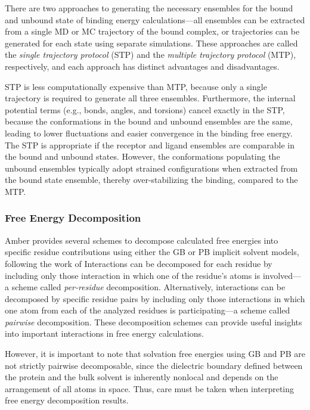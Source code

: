 There are two approaches to generating the necessary ensembles for the bound and
unbound state of binding energy calculations---all ensembles can be extracted
from a single MD or MC trajectory of the bound complex, or trajectories can be
generated for each state using separate simulations. \cite{Wang2006} These
approaches are called the \emph{single trajectory protocol} (STP) and the
\emph{multiple trajectory protocol} (MTP), respectively, and each approach has
distinct advantages and disadvantages.

STP is less computationally expensive than MTP, because only a single trajectory
is required to generate all three ensembles. Furthermore, the internal potential
terms (e.g., bonds, angles, and torsions) cancel exactly in the STP, because
the conformations in the bound and unbound ensembles are the same, leading to
lower fluctuations and easier convergence in the binding free energy. The STP is
appropriate if the receptor and ligand ensembles are comparable in the bound and
unbound states. However, the conformations populating the unbound ensembles
typically adopt strained configurations when extracted from the bound state
ensemble, thereby over-stabilizing the binding, compared to the MTP.

\subsubsection{Free Energy Decomposition}

Amber \cite{AMBER12} provides several schemes to decompose calculated free
energies into specific residue contributions using either the GB or PB implicit
solvent models, \cite{Metz2012} following the work of \citeauthor{Gohlke2003}
\cite{Gohlke2003} Interactions can be decomposed for each residue by including
only those interaction in which one of the residue's atoms is involved---a
scheme called \emph{per-residue} decomposition. Alternatively, interactions can
be decomposed by specific residue pairs by including only those interactions in
which one atom from each of the analyzed residues is participating---a scheme
called \emph{pairwise} decomposition. These decomposition schemes can provide
useful insights into important interactions in free energy calculations.
\cite{Gohlke2003}

However, it is important to note that solvation free energies using GB and PB
are not strictly pairwise decomposable, since the dielectric boundary defined
between the protein and the bulk solvent is inherently nonlocal and depends on
the arrangement of all atoms in space. Thus, care must be taken when
interpreting free energy decomposition results.

